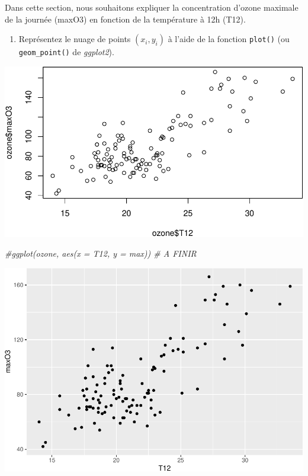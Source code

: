 \documentclass[
]{article}
\newenvironment{Shaded}{\begin{snugshade}}{\end{snugshade}}
\newcommand{\CommentTok}[1]{\textcolor[rgb]{0.56,0.35,0.01}{\textit{#1}}}
\newcommand{\FunctionTok}[1]{\textcolor[rgb]{0.13,0.29,0.53}{\textbf{#1}}}
\newcommand{\NormalTok}[1]{#1}
\newcommand{\SpecialCharTok}[1]{\textcolor[rgb]{0.81,0.36,0.00}{\textbf{#1}}}
\providecommand{\tightlist}{%
  \setlength{\itemsep}{0pt}\setlength{\parskip}{0pt}}
\begin{document}
Dans cette section, nous souhaitons expliquer la concentration d'ozone
maximale de la journée (maxO3) en fonction de la température à 12h
(T12).

\begin{enumerate}
\def\labelenumi{\arabic{enumi}.}
\tightlist
\item
  Représentez le nuage de points \((x_i,y_i)\) à l'aide de la fonction
  \texttt{plot()} (ou \texttt{geom\_point()} de \emph{ggplot2}).
\end{enumerate}

\begin{Shaded}
\end{Shaded}

\includegraphics{TP-ML-Regression_files/figure-latex/unnamed-chunk-6-1.pdf}

\begin{Shaded}
\begin{Highlighting}[]
\CommentTok{\#ggplot(ozone, aes(x = T12, y = max)) \# A FINIR}
\end{Highlighting}
\end{Shaded}

\includegraphics{TP-ML-Regression_files/figure-latex/unnamed-chunk-7-1.pdf}
\end{document}
